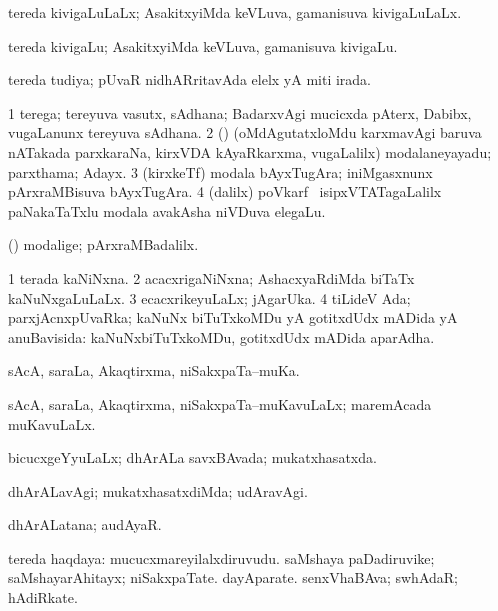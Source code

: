 \bentry
{}
\gl{\gu}
\bmng
tereda kivigaLuLaLx; AsakitxyiMda keVLuva, gamanisuva kivigaLuLaLx. 
\emng
\eentry

\bentry
{}
\gl{\nA}
\bmng
tereda kivigaLu; AsakitxyiMda keVLuva, gamanisuva kivigaLu. 
\emng
\eentry

\bentry
{}
\gl{\gu}
\bmng
tereda tudiya; pUvaR nidhARritavAda elelx yA miti irada. 
\emng
\eentry

\bentry
{}
\gl{\nA}
\bmng
\bnum
\num{1} terega; tereyuva vasutx, sAdhana; BadarxvAgi mucicxda pAterx, Dabibx, \mo vugaLanunx tereyuva sAdhana. 
\num{2} (\AmA) (oMdAgutatxloMdu karxmavAgi baruva nATakada parxkaraNa, kirxVDA kAyaRkarxma, \mo vugaLalilx) modalaneyayadu; parxthama; Adayx. 
\num{3} (kirxkeTf) modala bAyxTugAra; iniMgasxnunx pArxraMBisuva bAyxTugAra. 
\num{4} (\bava dalilx) poVkarf \mo\ isipxVTATagaLalilx paNakaTaTxlu modala avakAsha niVDuva elegaLu. 
\enum
\emng

\noindent
\gl{\pagu}
\bmng
{} (\AmA) modalige; pArxraMBadalilx. 
\emng
\eentry

\bentry
{}
\gl{\gu}
\bmng
\bnum
\num{1} terada kaNiNxna. 
\num{2} acacxrigaNiNxna; AshacxyaRdiMda biTaTx kaNuNxgaLuLaLx. 
\num{3} ecacxrikeyuLaLx; jAgarUka. 
\num{4} tiLideV Ada; parxjAcnxpUvaRka; kaNuNx biTuTxkoMDu yA gotitxdUdx mADida yA anuBavisida:  kaNuNxbiTuTxkoMDu, gotitxdUdx mADida aparAdha. 
\enum
\emng
\eentry

\bentry
{}
\gl{\nA}
\bmng
sAcA, saraLa, Akaqtirxma, niSakxpaTa--muKa. 
\emng
\eentry

\bentry
{}
\gl{\gu}
\bmng
sAcA, saraLa, Akaqtirxma, niSakxpaTa--muKavuLaLx; maremAcada muKavuLaLx. 
\emng
\eentry

\bentry
{}
\gl{\gu}
\bmng
bicucxgeYyuLaLx; dhArALa savxBAvada; mukatxhasatxda. 
\emng
\eentry

\bentry
{}
\gl{\kirxvi}
\bmng
dhArALavAgi; mukatxhasatxdiMda; udAravAgi. 
\emng
\eentry

\bentry
{}
\gl{\nA}
\bmng
dhArALatana; audAyaR. 
\emng
\eentry

\bentry
{}
\gl{\nA}
\bmng
tereda haqdaya: 
\banum
{} mucucxmareyilalxdiruvudu. 
 saMshaya paDadiruvike; saMshayarAhitayx; niSakxpaTate. 
 dayAparate. 
 senxVhaBAva; swhAdaR; hAdiRkate. 
\eanum
\emng
\eentry

